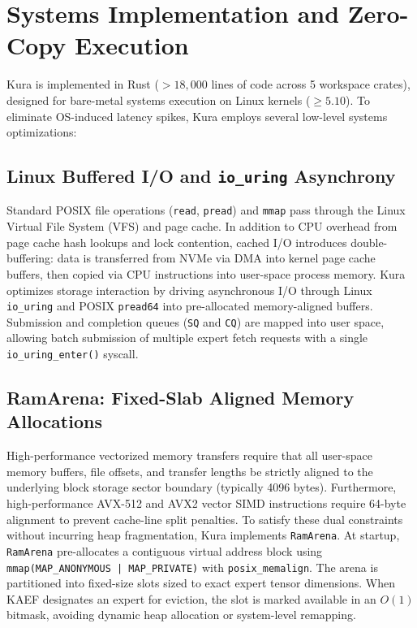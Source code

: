 \section{Systems Implementation and Zero-Copy Execution}
\label{sec:implementation}

Kura is implemented in Rust ($>18{,}000$ lines of code across 5 workspace crates), designed for bare-metal systems execution on Linux kernels ($\ge 5.10$). To eliminate OS-induced latency spikes, Kura employs several low-level systems optimizations:

\subsection{Linux Buffered I/O and \texttt{io\_uring} Asynchrony}
Standard POSIX file operations (\texttt{read}, \texttt{pread}) and \texttt{mmap} pass through the Linux Virtual File System (VFS) and page cache. In addition to CPU overhead from page cache hash lookups and lock contention, cached I/O introduces double-buffering: data is transferred from NVMe via DMA into kernel page cache buffers, then copied via CPU instructions into user-space process memory.
Kura optimizes storage interaction by driving asynchronous I/O through Linux \texttt{io\_uring} and POSIX \texttt{pread64} into pre-allocated memory-aligned buffers. Submission and completion queues (\texttt{SQ} and \texttt{CQ}) are mapped into user space, allowing batch submission of multiple expert fetch requests with a single \texttt{io\_uring\_enter()} syscall.

\subsection{RamArena: Fixed-Slab Aligned Memory Allocations}
High-performance vectorized memory transfers require that all user-space memory buffers, file offsets, and transfer lengths be strictly aligned to the underlying block storage sector boundary (typically 4096 bytes). Furthermore, high-performance AVX-512 and AVX2 vector SIMD instructions require 64-byte alignment to prevent cache-line split penalties.
To satisfy these dual constraints without incurring heap fragmentation, Kura implements \texttt{RamArena}. At startup, \texttt{RamArena} pre-allocates a contiguous virtual address block using \texttt{mmap(MAP\_ANONYMOUS | MAP\_PRIVATE)} with \texttt{posix\_memalign}. The arena is partitioned into fixed-size slots sized to exact expert tensor dimensions. When KAEF designates an expert for eviction, the slot is marked available in an $O(1)$ bitmask, avoiding dynamic heap allocation or system-level remapping.

